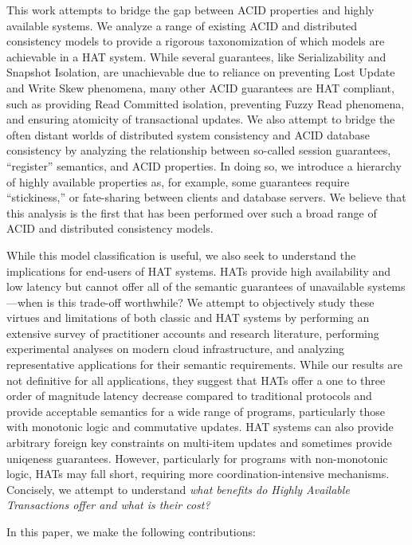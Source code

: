 This work attempts to bridge the gap between ACID properties and
highly available systems. We analyze a range of existing ACID and
distributed consistency models to provide a rigorous taxonomization of
which models are achievable in a HAT system.  While several
guarantees, like Serializability and Snapshot Isolation, are
unachievable due to reliance on preventing Lost Update and Write Skew
phenomena, many other ACID guarantees are HAT compliant, such as
providing Read Committed isolation, preventing Fuzzy Read phenomena,
and ensuring atomicity of transactional updates. We also attempt to
bridge the often distant worlds of distributed system consistency and
ACID database consistency by analyzing the relationship between
so-called session guarantees, ``register'' semantics, and ACID
properties. In doing so, we introduce a hierarchy of highly available
properties as, for example, some guarantees require ``stickiness,'' or
fate-sharing between clients and database servers. We believe that
this analysis is the first that has been performed over such a broad
range of ACID and distributed consistency models.

While this model classification is useful, we also seek to understand
the implications for end-users of HAT systems. HATs provide high
availability and low latency but cannot offer all of the semantic
guarantees of unavailable systems---when is this trade-off worthwhile?
We attempt to objectively study these virtues and limitations of both
classic and HAT systems by performing an extensive survey of
practitioner accounts and research literature, performing experimental
analyses on modern cloud infrastructure, and analyzing representative
applications for their semantic requirements. While our results are
not definitive for all applications, they suggest that HATs offer a
one to three order of magnitude latency decrease compared to
traditional protocols and provide acceptable semantics for a wide
range of programs, particularly those with monotonic logic and
commutative updates. HAT systems can also provide arbitrary foreign
key constraints on multi-item updates and sometimes provide uniqeness
guarantees. However, particularly for programs with non-monotonic
logic, HATs may fall short, requiring more coordination-intensive
mechanisms. Concisely, we attempt to understand \textit{what benefits
  do Highly Available Transactions offer and what is their cost?}

In this paper, we make the following contributions:

